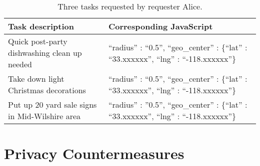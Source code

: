 \documentclass{USC-Thesis}
\numberwithin{equation}{chapter}
\begin{document}
\begin{table}
\begin{center}
    \begin{tabular}{ p{5cm}  |   p{6cm}}
    \hline
	Task description & Corresponding JavaScript \\ \hline
    Quick post-party dishwashing clean up needed & \small{``radius'' : ``0.5'', ``geo\_center'' : \{``lat'' : ``33.xxxxxx'', ``lng'' : ``-118.xxxxxx''\}} \\ \hline
    Take down light Christmas decorations & \small{``radius'' : ``0.5'', ``geo\_center'' : \{``lat'' : ``33.xxxxxx'', ``lng'' : ``-118.xxxxxx''\}} \\ \hline
    Put up 20 yard sale signs in Mid-Wilshire area & \small{``radius'' : ''0.5'', ``geo\_center'' : \{``lat'' : ``33.xxxxxx'', ``lng'' : ``-118.xxxxxx''\}} \\ \hline
    \end{tabular}
	\caption{Three tasks requested by requester Alice.}
    \label{tab:requested_tasks}
    \end{center}
\end{table}

\section{Privacy Countermeasures}
\end{document}
